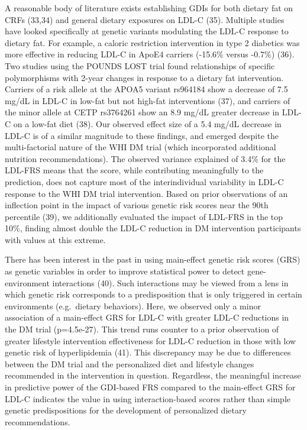 \documentclass[]{article}
\begin{document}
A reasonable body of literature exists establishing GDIs for both
dietary fat on CRFs (33,34) and general dietary exposures on LDL-C (35).
Multiple studies have looked specifically at genetic variants modulating
the LDL-C response to dietary fat. For example, a caloric restriction
intervention in type 2 diabetics was more effective in reducing LDL-C in
ApoE4 carriers (-15.6\% versus -0.7\%) (36). Two studies using the
POUNDS LOST trial found relationships of specific polymorphisms with
2-year changes in response to a dietary fat intervention. Carriers of a
risk allele at the APOA5 variant rs964184 show a decrease of 7.5 mg/dL
in LDL-C in low-fat but not high-fat interventions (37), and carriers of
the minor allele at CETP rs3764261 show an 8.9 mg/dL greater decrease in
LDL-C on a low-fat diet (38). Our observed effect size of a 5.4 mg/dL
decrease in LDL-C is of a similar magnitude to these findings, and
emerged despite the multi-factorial nature of the WHI DM trial (which
incorporated additional nutrition recommendations). The observed
variance explained of 3.4\% for the LDL-FRS means that the score, while
contributing meaningfully to the prediction, does not capture most of
the interindividual variability in LDL-C response to the WHI DM trial
intervention. Based on prior observations of an inflection point in the
impact of various genetic risk scores near the 90th percentile (39), we
additionally evaluated the impact of LDL-FRS in the top 10\%, finding
almost double the LDL-C reduction in DM intervention participants with
values at this extreme.

There has been interest in the past in using main-effect genetic risk
scores (GRS) as genetic variables in order to improve statistical power
to detect gene-environment interactions (40). Such interactions may be
viewed from a lens in which genetic risk corresponds to a predisposition
that is only triggered in certain environments (e.g.~dietary behaviors).
Here, we observed only a minor association of a main-effect GRS for
LDL-C with greater LDL-C reductions in the DM trial (p=4.5e-27). This
trend runs counter to a prior observation of greater lifestyle
intervention effectiveness for LDL-C reduction in those with low genetic
risk of hyperlipidemia (41). This discrepancy may be due to differences
between the DM trial and the personalized diet and lifestyle changes
recommended in the intervention in question. Regardless, the meaningful
increase in predictive power of the GDI-based FRS compared to the
main-effect GRS for LDL-C indicates the value in using interaction-based
scores rather than simple genetic predispositions for the development of
personalized dietary recommendations.
\end{document}
